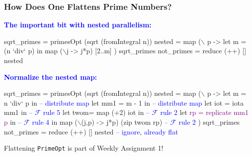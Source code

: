 \documentclass{beamer}
\newcommand{\blue}[1]{\textcolor{Blue}{{#1}}}
\newcommand{\purple}[1]{\textcolor{Purple}{{#1}}}
\renewcommand{\emph}[1]{\textcolor{structure}{#1}}
\newcommand{\emp}[1]{\textcolor{DikuRed}{ #1}}
\newcommand{\mymath}[1]{$ #1 $}
\newcommand{\myindu}[1]{^{#1}}
\begin{document}
\begin{frame}[fragile,t]
  \frametitle{How Does One Flattens Prime Numbers?}

\blue{\bf The important bit with nested parallelism:}
\begin{colorcode}[fontsize=\scriptsize]
sqrt_primes = primesOpt (sqrt (fromIntegral n))
nested = \emp{map} (\mymath{\backslash}\emp{p} -> let m = (n `div` p)
                     in  \emp{map} (\mymath{\backslash}j -> j*p) [2..m]
             ) \emp{sqrt_primes}
not_primes  = \emph{reduce} (++) [] nested
\end{colorcode}

\bigskip
\pause

\blue{\bf Normalize the nested map:}
\begin{colorcode}[fontsize=\scriptsize]
sqrt_primes = primesOpt (sqrt (fromIntegral n))
nested = \emp{map} (\mymath{\backslash}\emp{p} -> 
                  let \emph{m   = n `div` p}       in          \blue{-- distribute map}
                  let \emph{mm1 = m - 1}           in          \blue{-- distribute map}
                  let \emp{iot = \emp{iota} mm1}        in          \blue{-- \mymath{\mathcal{F}} rule 5}
                  let \emph{twom= \emp{map} (+2) iot}    in          \blue{-- \mymath{\mathcal{F}} rule 2}
                  let \purple{rp  = replicate mm1 p} in          \blue{-- \mymath{\mathcal{F}} rule 4}
                  in  \emph{map} (\mymath{\backslash}(j,p) -> j*p) (zip twom rp) \blue{-- \mymath{\mathcal{F}} rule 2}
             ) \emp{sqrt_primes}
not_primes  = \emph{reduce} (++) [] nested               \blue{-- ignore, already flat}
\end{colorcode}

\alert{Flattening {\tt PrimeOpt} is part of Weekly Assignment 1!}

\end{frame}


%
%
%
%
%
%
%
%
\end{document}
